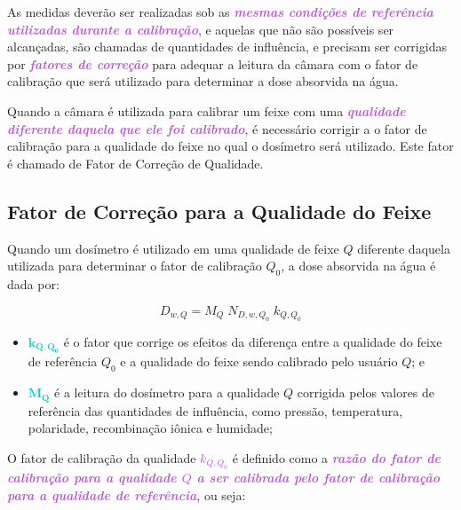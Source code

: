\documentclass[11pt,a4paper]{article}
\newcounter{exemplo}
\begin{document}
	As medidas deverão ser realizadas sob as \textcolor{MediumOrchid}{\textit{\textbf{mesmas condições de referência utilizadas durante a calibração}}}, e aquelas que não são possíveis ser alcançadas, são chamadas de quantidades de influência, e precisam ser corrigidas por \textcolor{MediumOrchid}{\textit{\textbf{fatores de correção}}} para adequar a leitura da câmara com o fator de calibração que será utilizado para determinar a dose absorvida na água.

	Quando a câmara é utilizada para calibrar um feixe com uma \textcolor{MediumOrchid}{\textit{\textbf{qualidade diferente daquela que ele foi calibrado}}}, é necessário corrigir a o fator de calibração para a qualidade do feixe no qual o dosímetro será utilizado. Este fator é chamado de Fator de Correção de Qualidade.

	\subsection{Fator de Correção para a Qualidade do Feixe}

	Quando um dosímetro é utilizado em uma qualidade de feixe $Q$ diferente daquela utilizada para determinar o fator de calibração $Q_0$, a dose absorvida na água é dada por:

		\begin{equation}
			D_{w,Q} = M_Q \; N_{D,w,Q_0} \; k_{Q,Q_0}
			\label{eq:doseAguaCorrigidaQualidade}
		\end{equation}

		\begin{exemplo}[onde:]
			\begin{itemize}[label=\textcolor{CarnationPink}{$\star$}]
				\item \textbf{\textcolor{DarkTurquoise}{$\mathbf{k_{Q,Q_0}}$}} é o fator que corrige os efeitos da diferença entre a qualidade do feixe de referência $Q_0$ e a qualidade do feixe sendo calibrado pelo usuário $Q$; e
				\item \textbf{\textcolor{DarkTurquoise}{$\mathbf{M_Q}$}} é a leitura do dosímetro para a qualidade $Q$ corrigida pelos valores de referência das quantidades de influência, como pressão, temperatura, polaridade, recombinação iônica e humidade;
			\end{itemize}
		\end{exemplo}

		O fator de calibração da qualidade \textcolor{MediumOrchid}{\textit{\textbf{$k_{Q,Q_0}$}}} é definido como a \textcolor{MediumOrchid}{\textit{\textbf{razão do fator de calibração para a qualidade $Q$ a ser calibrada pelo fator de calibração para a qualidade de referência}}}, ou seja:
\end{document}
